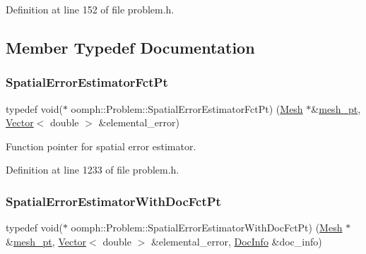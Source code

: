 Definition at line 152 of file problem.\+h.



\subsection{Member Typedef Documentation}
\mbox{\label{classoomph_1_1Problem_a638b525d7cae45e56160e3c282c8ad09}} 
\subsubsection{\texorpdfstring{Spatial\+Error\+Estimator\+Fct\+Pt}{SpatialErrorEstimatorFctPt}}
{\footnotesize\ttfamily typedef void($\ast$ oomph\+::\+Problem\+::\+Spatial\+Error\+Estimator\+Fct\+Pt) (\hyperlink{classoomph_1_1Mesh}{Mesh} $\ast$\&\hyperlink{classoomph_1_1Problem_aad122d70a22dc5302cfd5853d3cf3057}{mesh\+\_\+pt}, \hyperlink{classoomph_1_1Vector}{Vector}$<$ double $>$ \&elemental\+\_\+error)}



Function pointer for spatial error estimator. 



Definition at line 1233 of file problem.\+h.

\mbox{\label{classoomph_1_1Problem_a220abfde16b8b1b544b4127e0e4cc9e4}} 
\subsubsection{\texorpdfstring{Spatial\+Error\+Estimator\+With\+Doc\+Fct\+Pt}{SpatialErrorEstimatorWithDocFctPt}}
{\footnotesize\ttfamily typedef void($\ast$ oomph\+::\+Problem\+::\+Spatial\+Error\+Estimator\+With\+Doc\+Fct\+Pt) (\hyperlink{classoomph_1_1Mesh}{Mesh} $\ast$\&\hyperlink{classoomph_1_1Problem_aad122d70a22dc5302cfd5853d3cf3057}{mesh\+\_\+pt}, \hyperlink{classoomph_1_1Vector}{Vector}$<$ double $>$ \&elemental\+\_\+error, \hyperlink{classoomph_1_1DocInfo}{Doc\+Info} \&doc\+\_\+info)}



